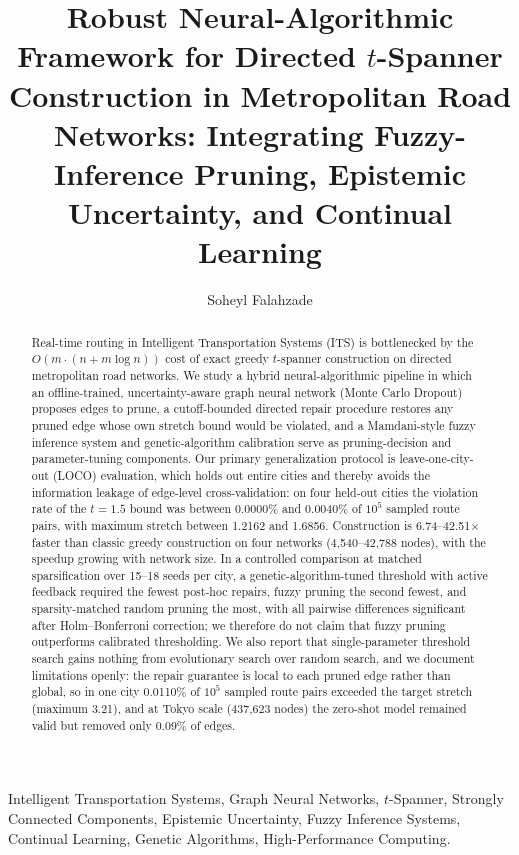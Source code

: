 \documentclass[journal]{IEEEtran}
\title{Robust Neural-Algorithmic Framework for Directed $t$-Spanner Construction in Metropolitan Road Networks: Integrating Fuzzy-Inference Pruning, Epistemic Uncertainty, and Continual Learning}
\author{Soheyl Falahzade}
\begin{document}
\maketitle

\begin{abstract}
Real-time routing in Intelligent Transportation Systems (ITS) is bottlenecked by the $O(m \cdot (n + m \log n))$ cost of exact greedy $t$-spanner construction on directed metropolitan road networks. We study a hybrid neural-algorithmic pipeline in which an offline-trained, uncertainty-aware graph neural network (Monte Carlo Dropout) proposes edges to prune, a cutoff-bounded directed repair procedure restores any pruned edge whose own stretch bound would be violated, and a Mamdani-style fuzzy inference system and genetic-algorithm calibration serve as pruning-decision and parameter-tuning components. Our primary generalization protocol is leave-one-city-out (LOCO) evaluation, which holds out entire cities and thereby avoids the information leakage of edge-level cross-validation: on four held-out cities the violation rate of the $t = 1.5$ bound was between 0.0000\% and 0.0040\% of $10^5$ sampled route pairs, with maximum stretch between 1.2162 and 1.6856. Construction is 6.74--42.51$\times$ faster than classic greedy construction on four networks (4,540--42,788 nodes), with the speedup growing with network size. In a controlled comparison at matched sparsification over 15--18 seeds per city, a genetic-algorithm-tuned threshold with active feedback required the fewest post-hoc repairs, fuzzy pruning the second fewest, and sparsity-matched random pruning the most, with all pairwise differences significant after Holm--Bonferroni correction; we therefore do not claim that fuzzy pruning outperforms calibrated thresholding. We also report that single-parameter threshold search gains nothing from evolutionary search over random search, and we document limitations openly: the repair guarantee is local to each pruned edge rather than global, so in one city 0.0110\% of $10^5$ sampled route pairs exceeded the target stretch (maximum 3.21), and at Tokyo scale (437,623 nodes) the zero-shot model remained valid but removed only 0.09\% of edges.
\end{abstract}

\begin{IEEEkeywords}
Intelligent Transportation Systems, Graph Neural Networks, $t$-Spanner, Strongly Connected Components, Epistemic Uncertainty, Fuzzy Inference Systems, Continual Learning, Genetic Algorithms, High-Performance Computing.
\end{IEEEkeywords}
\end{document}
